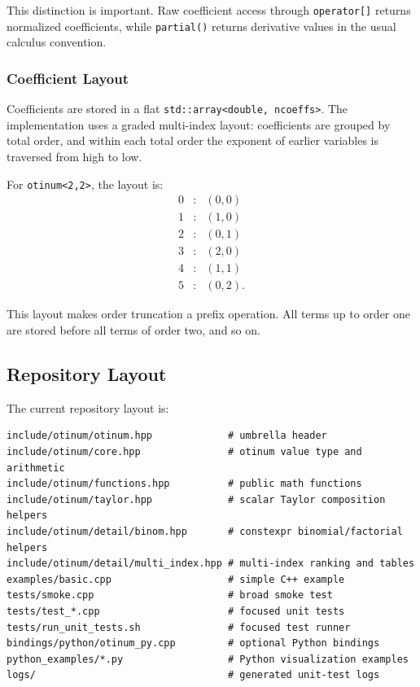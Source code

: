 \documentclass[11pt]{article}
\begin{document}
This distinction is important. Raw coefficient access through
\texttt{operator[]} returns normalized coefficients, while \texttt{partial()}
returns derivative values in the usual calculus convention.

\subsubsection{Coefficient Layout}

Coefficients are stored in a flat \texttt{std::array<double, ncoeffs>}.
The implementation uses a graded multi-index layout: coefficients are grouped
by total order, and within each total order the exponent of earlier variables
is traversed from high to low.

For \texttt{otinum<2,2>}, the layout is:
\[
\begin{array}{ccl}
0 &:& (0,0) \\
1 &:& (1,0) \\
2 &:& (0,1) \\
3 &:& (2,0) \\
4 &:& (1,1) \\
5 &:& (0,2).
\end{array}
\]

This layout makes order truncation a prefix operation. All terms up to order
one are stored before all terms of order two, and so on.

\subsection{Repository Layout}

The current repository layout is:

\begin{lstlisting}[style=shellstyle]
include/otinum/otinum.hpp             # umbrella header
include/otinum/core.hpp               # otinum value type and arithmetic
include/otinum/functions.hpp          # public math functions
include/otinum/taylor.hpp             # scalar Taylor composition helpers
include/otinum/detail/binom.hpp       # constexpr binomial/factorial helpers
include/otinum/detail/multi_index.hpp # multi-index ranking and tables
examples/basic.cpp                    # simple C++ example
tests/smoke.cpp                       # broad smoke test
tests/test_*.cpp                      # focused unit tests
tests/run_unit_tests.sh               # focused test runner
bindings/python/otinum_py.cpp         # optional Python bindings
python_examples/*.py                  # Python visualization examples
logs/                                 # generated unit-test logs
\end{lstlisting}
\end{document}
